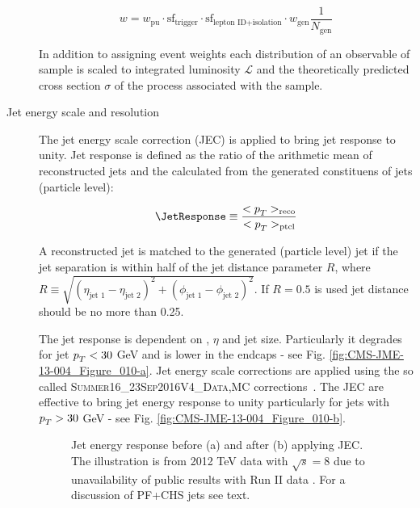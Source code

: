 \begin{description}
\begin{equation}
w=w_{\text{pu}}\cdot\text{sf}_{\text{trigger}}\cdot\text{sf}_{\text{lepton\ ID+isolation}}\cdot w_{\text{gen}}\frac{1}{N_{\text{gen}}}
\label{eq:ev_w}
\end{equation}

In addition to assigning event weights each distribution of an observable of sample is scaled to integrated luminosity $\mathcal{L}$ and the theoretically predicted cross section $\sigma$ of the process associated with the sample. 


\item[Jet energy scale and resolution]
  The jet energy scale correction (JEC) is applied to bring jet response to unity. Jet response \JetResponse is defined as the ratio of the arithmetic mean of reconstructed jets \pt and the \pt calculated from the generated constituens of jets (particle level): 
  
\begin{equation}
\JetResponse\equiv\frac{<\pt>_{\text{reco}}}{<\pt>_{\text{ptcl}}}    
\end{equation}

A reconstructed jet is matched to the generated (particle level) jet if the jet separation is within half of the jet distance parameter $R$, where $R\equiv\sqrt{\left(\eta_{\text{jet\ 1}} - \eta_{\text{jet\ 2}} \right)^{2}+\left(\phi_{\text{jet\ 1}} - \phi_{\text{jet\ 2}}\right)^{2}}$. If $R=0.5$ is used jet distance should be no more than 0.25.

The jet response is dependent on \pt, $\eta$ and jet size. Particularly it degrades for jet $p_{T}^{}<30$ GeV and is lower in the endcaps - see Fig. \ref{fig:CMS-JME-13-004_Figure_010-a}. Jet energy scale corrections are applied using the so called \textsc{Summer16\_23Sep2016V4\_{Data,MC}} corrections~\cite{twiki:JES}. The JEC are effective to bring jet energy response to unity particularly for jets with $p_{T}^{}>30$ GeV - see Fig. \ref{fig:CMS-JME-13-004_Figure_010-b}. 

\begin{figure}[htp]
\centering
  \def\twidth{0.45}
  \centering
\caption{Jet energy response before (a) and after (b) applying JEC. The illustration is from 2012 TeV data with $\sqrt{s}=8$ due to unavailability of public results with Run II data \cite{Khachatryan:2016kdb}. For a discussion of PF+CHS jets see text.}
\label{fig:CMS-JME-13-004_Figure_010}
\end{figure}


\end{description}
